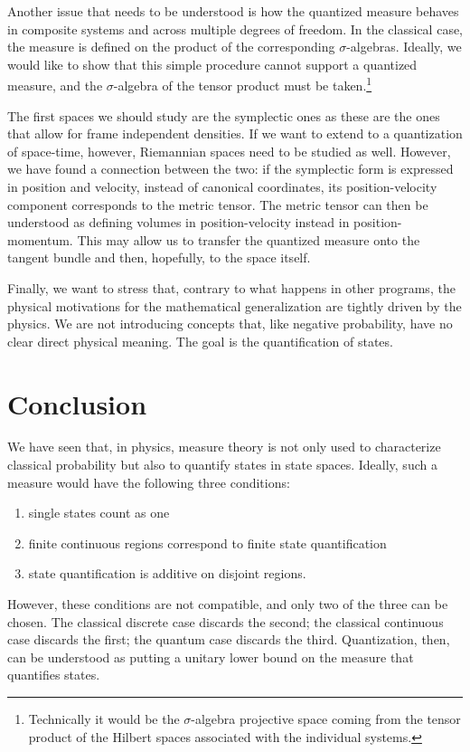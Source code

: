 \documentclass[entropy,article,submit,pdftex,moreauthors]{Definitions/mdpi}
\begin{document}
Another issue that needs to be understood is how the quantized measure behaves in composite systems and across multiple degrees of freedom. In the classical case, the measure is defined on the product of the corresponding $\sigma$-algebras. Ideally, we would like to show that this simple procedure cannot support a quantized measure, and the $\sigma$-algebra of the tensor product must be taken.\footnote{Technically it would be the $\sigma$-algebra projective space coming from the tensor product of the Hilbert spaces associated with the individual systems.}

The first spaces we should study are the symplectic ones as these are the ones that allow for frame independent densities. If we want to extend to a quantization of space-time, however, Riemannian spaces need to be studied as well. However, we have found a connection between the two: if the symplectic form is expressed in position and velocity, instead of canonical coordinates, its position-velocity component corresponds to the metric tensor. The metric tensor can then be understood as defining volumes in position-velocity instead in position-momentum. This may allow us to transfer the quantized measure onto the tangent bundle and then, hopefully, to the space itself.

Finally, we want to stress that, contrary to what happens in other programs, the physical motivations for the mathematical generalization are tightly driven by the physics. We are not introducing concepts that, like negative probability, have no clear direct physical meaning. The goal is the quantification of states.

\section{Conclusion}

We have seen that, in physics, measure theory is not only used to characterize classical probability but also to quantify states in state spaces. Ideally, such a measure would have the following three conditions:
\begin{enumerate}
	\item single states count as one
	\item finite continuous regions correspond to finite state quantification
	\item state quantification is additive on disjoint regions.
\end{enumerate}
However, these conditions are not compatible, and only two of the three can be chosen. The classical discrete case discards the second; the classical continuous case discards the first; the quantum case discards the third. Quantization, then, can be understood as putting a unitary lower bound on the measure that quantifies states.
\end{document}
